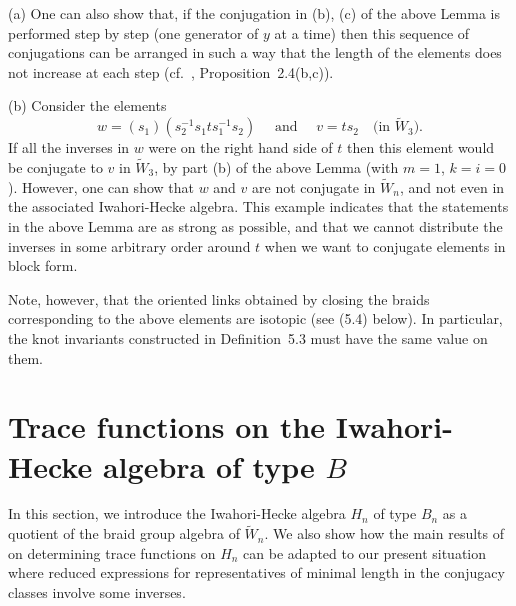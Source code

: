 \begin{rems} \rm 
(a) One can also  show that, if   the conjugation in  (b), (c)  of the
above Lemma is performed step by step (one generator of $y$ at a time)
then this sequence of conjugations can be arranged  in such a way that
the length  of the elements  does  not increase at  each step   (cf.\
\cite{GP}, Proposition~2.4(b,c)).

(b) Consider the elements
\[ w=(s_1) (s_2^{-1}s_1ts_1^{-1}s_2) \quad \mbox{ and } \quad v=ts_2 
\quad \mbox{(in $\tilde{W}_3$)}.\]
If  all the inverses in  $w$ were on the  right  hand side of $t$ then
this element would be  conjugate to $v$  in $\tilde{W}_3$, by part (b)
of the above Lemma  (with $m=1$, $k=i=0$). However,  one can show that
$w$  and $v$ are  not conjugate in $\tilde{W}_n$, and  not even in the
associated Iwahori-Hecke algebra.   This  example indicates  that  the
statements in the above Lemma  are as strong as  possible, and that we
cannot distribute the inverses in some arbitrary order around $t$ when
we want to conjugate elements in block form.

Note, however, that the oriented links obtained by closing the braids
corresponding to the above elements are isotopic (see (5.4) below). In 
particular, the knot invariants constructed in Definition~5.3 must
have the same value on them.
\end{rems}

\section{Trace  functions on the Iwahori-Hecke algebra of type $B$}

In this section, we introduce the  Iwahori-Hecke algebra $H_n$ of type
$B_n$ as a quotient of  the braid group algebra  of $\tilde{W}_n$.  We
also   show how the  main  results  of \cite{GP}  on determining trace
functions on  $H_n$ can be   adapted to  our  present situation  where
reduced expressions  for representatives   of minimal length    in the
conjugacy classes involve some inverses.


